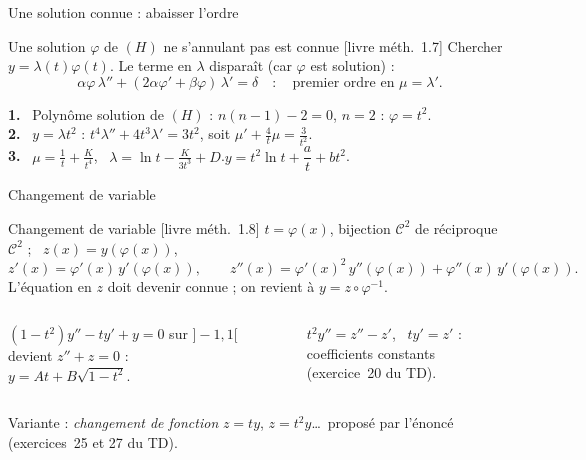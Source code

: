 \documentclass[aspectratio=169,10pt]{beamer}
\DeclareRobustCommand{\livre}[1]{{\sffamily\scriptsize\color{Gris}[livre #1]}}
\newcommand{\etape}[1]{{\sffamily\bfseries\footnotesize\color{Vert}#1}\ }
\begin{document}
\begin{frame}{Une solution connue : abaisser l'ordre}
\begin{METH}{Une solution $\varphi$ de $(H)$ ne s'annulant pas est connue \livre{méth.~1.7}}
Chercher $y=\lambda(t)\varphi(t)$. Le terme en $\lambda$ disparaît (car $\varphi$ est solution) :
\[\alpha\varphi\,\lambda''+(2\alpha\varphi'+\beta\varphi)\,\lambda'=\delta\quad:\quad\text{premier ordre en }\mu=\lambda'.\]
\end{METH}
\pause
\begin{EX}[$t^2y''-2y=3t^2$ sur $\R_+^*$]
\etape{1.} Polynôme solution de $(H)$ : $n(n-1)-2=0$, $n=2$ : $\varphi=t^2$.\\
\etape{2.} $y=\lambda t^2$ : $t^4\lambda''+4t^3\lambda'=3t^2$, soit $\mu'+\frac4t\mu=\frac3{t^2}$.\\
\etape{3.} $\mu=\frac1t+\frac K{t^4}$, \ $\lambda=\ln t-\frac K{3t^3}+D$.\qquad $y=t^2\ln t+\dfrac at+bt^2$.
\end{EX}
\end{frame}

\begin{frame}{Changement de variable}
\begin{METH}{Changement de variable \livre{méth.~1.8}}
$t=\varphi(x)$, bijection $\mathcal C^2$ de réciproque $\mathcal C^2$ ; \ $z(x)=y(\varphi(x))$,
\[z'(x)=\varphi'(x)\,y'(\varphi(x)),\qquad z''(x)=\varphi'(x)^2\,y''(\varphi(x))+\varphi''(x)\,y'(\varphi(x)).\]
L'équation en $z$ doit devenir connue ; on revient à $y=z\circ\varphi^{-1}$.
\end{METH}
\pause
\begin{columns}[T]
\begin{EX}[$t=\cos x$]
$(1-t^2)y''-ty'+y=0$ sur $]-1,1[$ devient $z''+z=0$ :\\ $y=At+B\sqrt{1-t^2}$.
\end{EX}
\begin{EX}[Euler, $t=e^x$]
$t^2y''=z''-z'$, \ $ty'=z'$ :\\ coefficients constants (exercice~20 du TD).
\end{EX}
\end{columns}
{\small\color{Gris}Variante : \emph{changement de fonction} $z=ty$, $z=t^2y$\dots\ proposé par l'énoncé (exercices~25 et 27 du TD).}
\end{frame}
\end{document}
